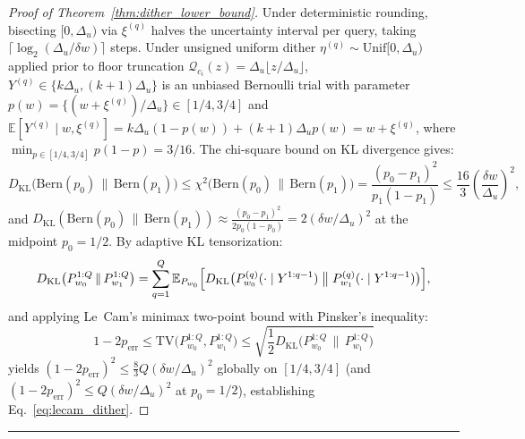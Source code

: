 \documentclass[10pt,twocolumn]{article}
\newcommand{\MidConnesRule}{%
  \par\vspace{4pt}\noindent\textcolor{black!25}{\rule{\textwidth}{0.4pt}}\par\vspace{4pt}%
}
\theoremstyle{spectralthm}
\begin{document}
\begin{proof}[Proof of Theorem~\ref{thm:dither_lower_bound}]
Under deterministic rounding, bisecting $[0, \Delta_u)$ via $\xi^{(q)}$ halves the uncertainty interval per query, taking $\lceil \log_2(\Delta_u/\delta w) \rceil$ steps. Under unsigned uniform dither $\eta^{(q)} \sim \mathrm{Unif}[0, \Delta_u)$ applied prior to floor truncation $\mathcal{Q}_{c_i}(z) = \Delta_u \lfloor z/\Delta_u \rfloor$, $Y^{(q)} \in \{k\Delta_u, (k+1)\Delta_u\}$ is an unbiased Bernoulli trial with parameter $p(w) = \{ (w + \xi^{(q)})/\Delta_u \} \in [1/4, 3/4]$ and $\mathbb{E}[Y^{(q)} \mid w, \xi^{(q)}] = k\Delta_u(1 - p(w)) + (k+1)\Delta_u p(w) = w + \xi^{(q)}$, where $\min_{p \in [1/4,3/4]} p(1-p) = 3/16$. The chi-square bound on KL divergence gives:
\[
D_{\mathrm{KL}}\bigl(\mathrm{Bern}(p_0)\,\|\,\mathrm{Bern}(p_1)\bigr) \le \chi^2\bigl(\mathrm{Bern}(p_0)\,\|\,\mathrm{Bern}(p_1)\bigr)
= \frac{(p_0 - p_1)^2}{p_1(1 - p_1)} \le \frac{16}{3}\left(\frac{\delta w}{\Delta_u}\right)^2,
\]
and $D_{\mathrm{KL}}(\mathrm{Bern}(p_0)\,\|\,\mathrm{Bern}(p_1)) \approx \frac{(p_0 - p_1)^2}{2 p_0(1 - p_0)} = 2(\delta w/\Delta_u)^2$ at the midpoint $p_0 = 1/2$. By adaptive KL tensorization:
\[
D_{\mathrm{KL}}\bigl(P_{w_0}^{1:Q} \,\|\, P_{w_1}^{1:Q}\bigr) = \sum_{q=1}^Q \mathbb{E}_{P_{w_0}}\Bigl[D_{\mathrm{KL}}\bigl(P_{w_0}^{(q)}(\cdot \mid Y^{1:q-1}) \;\big\|\; P_{w_1}^{(q)}(\cdot \mid Y^{1:q-1})\bigr)\Bigr],
\]
and applying Le~Cam's minimax two-point bound with Pinsker's inequality:
\[
1 - 2p_{\mathrm{err}} \le \mathrm{TV}\bigl(P_{w_0}^{1:Q}, P_{w_1}^{1:Q}\bigr) \le \sqrt{\frac{1}{2} D_{\mathrm{KL}}\bigl(P_{w_0}^{1:Q} \,\|\, P_{w_1}^{1:Q}\bigr)}
\]
yields $(1 - 2p_{\mathrm{err}})^2 \le \frac{8}{3} Q (\delta w/\Delta_u)^2$ globally on $[1/4,3/4]$ (and $(1 - 2p_{\mathrm{err}})^2 \le Q (\delta w/\Delta_u)^2$ at $p_0 = 1/2$), establishing Eq.~\eqref{eq:lecam_dither}.
\end{proof}
\MidConnesRule
\end{document}
